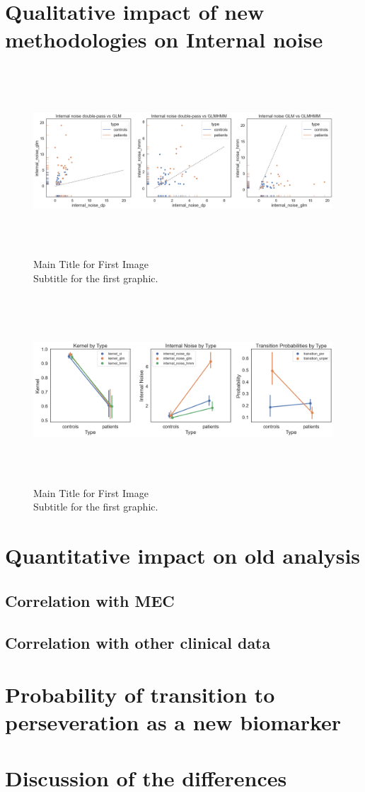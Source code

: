 \section{Qualitative impact of new methodologies on Internal noise}
\begin{figure}[H]
    \centering
    \includegraphics[width=17cm,height=7cm]{MainLayout/Images/chapter8/in_methods_participants.png}
    \caption{Main Title for First Image \\ \small Subtitle for the first graphic.}
    \label{fig:in_methods_participants}
\end{figure}
\begin{figure}[H]
    \centering
    \includegraphics[width=17cm,height=7cm]{MainLayout/Images/chapter8/comparison_method.png}
    \caption{Main Title for First Image \\ \small Subtitle for the first graphic.}
    \label{fig:comparison_method}
\end{figure}
\section{Quantitative impact on old analysis}

\subsection {Correlation with MEC} 

\subsection {Correlation with other clinical data} 

\section{Probability of transition to perseveration as a new biomarker} 

\section{Discussion of the differences} 